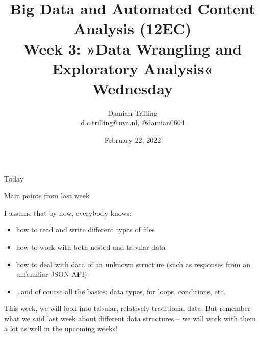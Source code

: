 

\graphicspath{{../../resources/img/}}




\title[Big Data and Automated Content Analysis]{\textbf{Big Data and Automated Content Analysis (12EC)} 
\\Week 3: »Data Wrangling and Exploratory Analysis«
\\Wednesday}
\author[Damian Trilling]{Damian Trilling\\ \footnotesize{d.c.trilling@uva.nl, @damian0604 \\}}
\date{February 22, 2022}


\begin{frame}{}
	\titlepage
\end{frame}

\begin{frame}{Today}
	\tableofcontents
\end{frame}





\begin{frame}{Main points from last week}

\begin{alertblock}{I assume that by now, everybody knows:}
\begin{itemize}
\item how to read and write different types of files
\item how to work with both nested and tabular data
\item how to deal with data of an unknown structure (such as responses from an unfamiliar JSON API)
\item \ldots and of course all the basics: data types, for loops, conditions, etc.
\end{itemize}
\end{alertblock}
\end{frame}


\begin{frame}[standout]
This week, we will look into tabular, relatively traditional data. But remember what we said last week about different data structures -- we will work with them a lot as well in the upcoming weeks!
\end{frame}











